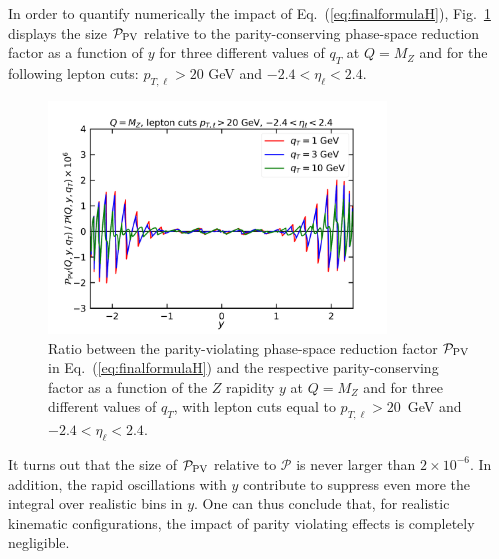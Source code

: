 \documentclass[10pt,a4paper]{article}
\begin{document}
In order to quantify numerically the impact of
Eq.~(\ref{eq:finalformulaH}), Fig.~\ref{fig:PhaseSpaceRedFactor}
displays the size $\mathcal{P}_{\rm PV}$ relative to the
parity-conserving phase-space reduction factor as a function of $y$
for three different values of $q_T$ at $Q=M_Z$ and for the following
lepton cuts: $p_{T,\ell}>20$ GeV and $-2.4 < \eta_\ell < 2.4$.
\begin{figure}[t]
  \begin{centering}
    \includegraphics[width=0.8\textwidth]{plots/PhaseSpaceRedFactor}
    \caption{Ratio between the parity-violating phase-space reduction
      factor $\mathcal{P}_{\rm PV}$ in Eq.~(\ref{eq:finalformulaH})
      and the respective parity-conserving factor as a function of the
      $Z$ rapidity $y$ at $Q=M_Z$ and for three different values of
      $q_T$, with lepton cuts equal to $p_{T,\ell}>20$~GeV and
      $-2.4 < \eta_\ell < 2.4$.\label{fig:PhaseSpaceRedFactor}}
  \end{centering}
\end{figure}
It turns out that the size of $\mathcal{P}_{\rm PV}$ relative to
$\mathcal{P}$ is never larger than $2\times10^{-6}$. In addition, the
rapid oscillations with $y$ contribute to suppress even more the
integral over realistic bins in $y$. One can thus conclude that, for
realistic kinematic configurations, the impact of parity violating
effects is completely negligible.

\end{document}
